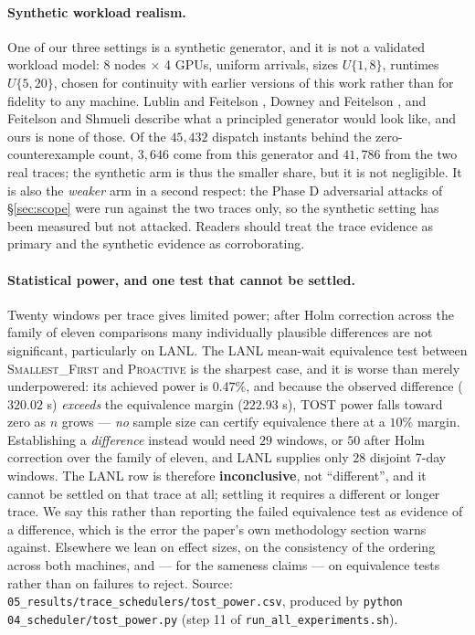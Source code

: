 \documentclass[11pt,twocolumn]{article}
\begin{document}
\paragraph{Synthetic workload realism.}
One of our three settings is a synthetic generator, and it is not a validated
workload model: 8 nodes $\times$ 4 GPUs, uniform arrivals, sizes $U\{1,8\}$,
runtimes $U\{5,20\}$, chosen for continuity with earlier versions of this work
rather than for fidelity to any machine. Lublin and Feitelson
\cite{Lublin2003}, Downey and Feitelson \cite{Downey1999}, and Feitelson and
Shmueli \cite{Feitelson2009} describe what a principled generator would look
like, and ours is none of those. Of the $45{,}432$ dispatch instants behind the
zero-counterexample count, $3{,}646$ come from this generator and $41{,}786$
from the two real traces; the synthetic arm is thus the smaller share, but it is
not negligible. It is also the \emph{weaker} arm in a second respect: the Phase D
adversarial attacks of \S\ref{sec:scope} were run against the two traces only,
so the synthetic setting has been measured but not attacked. Readers should
treat the trace evidence as primary and the synthetic evidence as corroborating.

\paragraph{Statistical power, and one test that cannot be settled.}
Twenty windows per trace gives limited power; after Holm correction across the
family of eleven comparisons many individually plausible differences are not
significant, particularly on LANL. The LANL mean-wait equivalence test between
\textsc{Smallest\_First} and \textsc{Proactive} is the sharpest case, and it is
worse than merely underpowered: its achieved power is $0.47\%$, and because the
observed difference ($320.02$ s) \emph{exceeds} the equivalence margin
($222.93$ s), TOST power falls toward zero as $n$ grows --- \emph{no} sample
size can certify equivalence there at a $10\%$ margin. Establishing a
\emph{difference} instead would need $29$ windows, or $50$ after Holm correction
over the family of eleven, and LANL supplies only $28$ disjoint 7-day windows.
The LANL row is therefore \textbf{inconclusive}, not ``different'', and it
cannot be settled on that trace at all; settling it requires a different or
longer trace. We say this rather than reporting the failed equivalence test as
evidence of a difference, which is the error the paper's own methodology section
warns against. Elsewhere we lean on effect sizes, on the consistency of the
ordering across both machines, and --- for the sameness claims --- on
equivalence tests rather than on failures to reject.
{\small Source:
\texttt{05\_results/trace\_schedulers/tost\_power.csv}, produced by
\texttt{python 04\_scheduler/tost\_power.py} (step 11 of
\texttt{run\_all\_experiments.sh}).}
\end{document}
